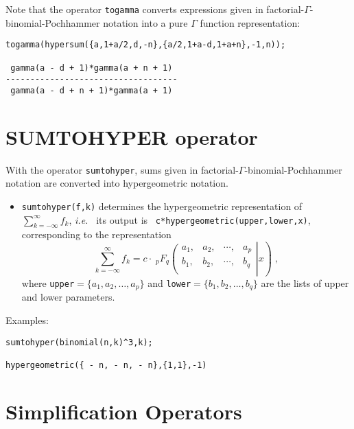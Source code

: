 Note that the operator {\tt togamma} converts
expressions given in factorial-$\Gamma$-binomial-Pochhammer notation
into a pure $\Gamma$ function representation: 

\begin{verbatim}
togamma(hypersum({a,1+a/2,d,-n},{a/2,1+a-d,1+a+n},-1,n));

 gamma(a - d + 1)*gamma(a + n + 1)
-----------------------------------
 gamma(a - d + n + 1)*gamma(a + 1)
\end{verbatim}

\section{SUMTOHYPER operator}

With the operator {\tt sumtohyper}, sums given in
factorial-$\Gamma$-binomial-Poch\-hammer notation are converted into
hypergeometric notation. 
\begin{itemize}
\item
{\tt sumtohyper(f,k)} determines the hypergeometric representation
of\linebreak
$\sum\limits_{k=-\infty}^\infty f_k$, {\em i.e.\ } its output is {\tt
c*hypergeometric(upper,lower,x)}, corresponding to 
the representation
\[
\sum\limits_{k=-\infty}^\infty f_k=c\cdot\;
_{p}F_{q}\left.\left(\begin{array}{cccc}
a_{1},&a_{2},&\cdots,&a_{p}\\
b_{1},&b_{2},&\cdots,&b_{q}\\
            \end{array}\right| x\right)
\;,
\]
where {\tt upper}$=\{a_{1}, a_{2}, \ldots, a_{p}\}$
and {\tt lower}$=\{b_{1}, b_{2}, \ldots, b_{q}\}$
are the lists of upper and lower parameters.
\end{itemize}
Examples:

\begin{verbatim}
sumtohyper(binomial(n,k)^3,k);

hypergeometric({ - n, - n, - n},{1,1},-1)
\end{verbatim}


\section{Simplification Operators}

